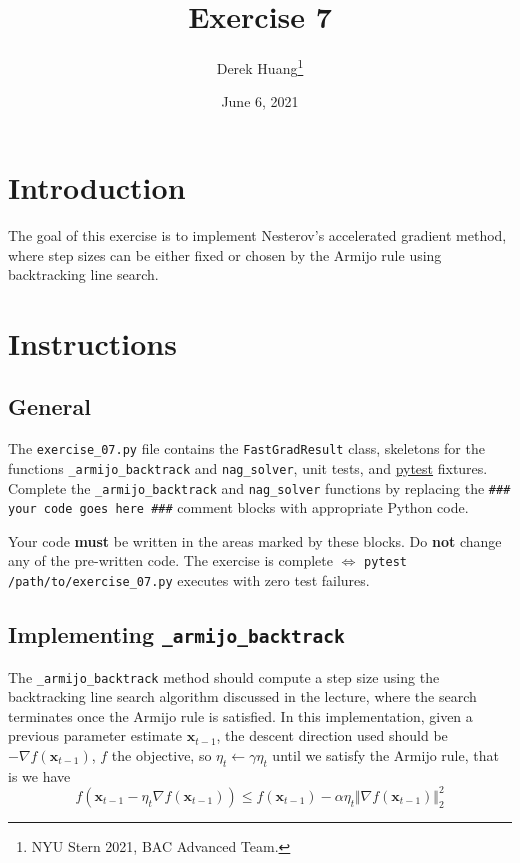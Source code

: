 \documentclass{article}
\title{Exercise 7}
\author{Derek Huang\thanks{NYU Stern 2021, BAC Advanced Team.}}
\date{June 6, 2021}
\numberwithin{equation}{section}
\newcommand{\pytest}{\href{https://docs.pytest.org/en/stable/}{pytest}}
\newcommand{\armijobacktrack}{\texttt{\_armijo\_backtrack}}
\newcommand{\nagsolver}{\texttt{nag\_solver}}
\begin{document}
\maketitle
\thispagestyle{fancy}


\section{Introduction}

The goal of this exercise is to implement Nesterov's accelerated gradient
method, where step sizes can be either fixed or chosen by the Armijo rule
using backtracking line search.

\section{Instructions}

\subsection{General}

The \texttt{exercise\_07.py} file contains the \texttt{FastGradResult} class,
skeletons for the functions \armijobacktrack{} and \nagsolver, unit tests,
and \pytest{} fixtures. Complete the \armijobacktrack{} and \nagsolver{}
functions by replacing the \texttt{\#\#\# your code goes here \#\#\#} comment
blocks with appropriate Python code.

\medskip

Your code \textbf{must} be written in the areas marked by these blocks. Do
\textbf{not} change any of the pre-written code. The exercise is complete
$ \Leftrightarrow $ \texttt{pytest /path/to/exercise\_07.py} executes with
zero test failures.

\subsection{Implementing \armijobacktrack}

The \armijobacktrack{} method should compute a step size using the
backtracking line search algorithm discussed in the lecture, where the search terminates once the Armijo rule is satisfied. In this implementation, given a
previous parameter estimate $ \mathbf{x}_{t - 1} $, the descent direction
used should be $ -\nabla f(\mathbf{x}_{t - 1}) $, $ f $ the objective, so
$ \eta_t \leftarrow \gamma\eta_t $ until we satisfy the Armijo rule, that is
we have
\begin{equation*}
    f(\mathbf{x}_{t - 1} - \eta_t\nabla f(\mathbf{x}_{t - 1})) \le
    f(\mathbf{x}_{t - 1}) - \alpha\eta_t
    \Vert\nabla f(\mathbf{x}_{t - 1})\Vert_2^2
\end{equation*}
\end{document}
